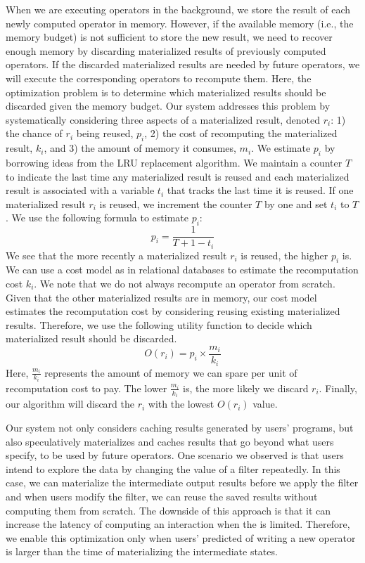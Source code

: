 When we are executing operators in the background, we store the result of each newly computed operator in memory. 
However, if the available memory (i.e., the memory budget) is not sufficient to store the new result, 
we need to recover enough memory by discarding materialized results of previously computed operators. 
If the discarded materialized results are needed by future operators, we will execute the corresponding operators to recompute them. 
Here, the optimization problem is to determine which materialized results should be discarded given the memory budget. 
Our system addresses this problem by systematically considering three aspects of a materialized result, denoted $r_i$: 
1) the chance of $r_i$ being reused, $p_i$, 
2) the cost of recomputing the materialized result, $k_i$, 
and 3) the amount of memory it consumes, $m_i$. 
We estimate $p_i$ by borrowing ideas from the LRU replacement algorithm. 
We maintain a counter $T$ to indicate the last time any materialized result is reused 
and each materialized result is associated with a variable $t_i$ that tracks the last time it is reused.
If one materialized result $r_i$ is reused, we increment the counter $T$ by one and set $t_i$ to $T$. 
We use the following formula to estimate $p_i$: 
\begin{equation}
p_i = \frac{1}{T + 1 - t_i}
\end{equation}
We see that the more recently a materialized result $r_i$ is reused, the higher $p_i$ is. 
We can use a cost model as in relational databases to estimate the recomputation cost $k_i$. 
We note that we do not always recompute an operator from scratch. 
Given that the other materialized results are in memory, 
our cost model estimates the recomputation cost by considering reusing existing materialized results. 
Therefore, we use the following utility function to decide which materialized result should be discarded.
\begin{equation}
O(r_i) = p_i \times \frac{m_i}{k_i}
\end{equation}
Here, $\frac{m_i}{k_i}$ represents the amount of memory we can spare per unit of recomputation cost to pay. 
The lower $\frac{m_i}{k_i}$ is, the more likely we discard $r_i$. 
Finally, our algorithm will discard the $r_i$ with the lowest $O(r_i)$ value.

Our system not only considers caching results generated by users' programs, 
but also speculatively materializes and caches results that go beyond what users specify, to be used by future operators. 
One scenario we observed is that users intend to explore the data by changing the value of a filter 
repeatedly. In this case, we can materialize the intermediate output results before we apply the filter 
and when users modify the filter, we can reuse the saved results without computing them from scratch. 
The downside of this approach is that it can increase the latency of computing an interaction when the \thinktime is limited. 
Therefore, we enable this optimization only when users' predicted \thinktime of writing a new operator 
is larger than the time of materializing the intermediate states.


